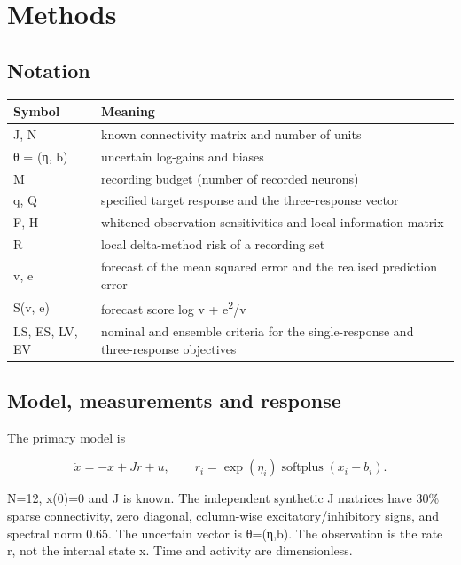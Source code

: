 \section{Methods}

\subsection{Notation}

\begin{table}[!t]
\centering\small
\begin{tabular*}{\textwidth}{@{\extracolsep{\fill}}ll}
\toprule
Symbol & Meaning \\
\midrule
J, N & known connectivity matrix and number of units \\
θ = (η, b) & uncertain log-gains and biases \\
M & recording budget (number of recorded neurons) \\
q, Q & specified target response and the three-response vector \\
F, H & whitened observation sensitivities and local information matrix \\
R & local delta-method risk of a recording set \\
v, e & forecast of the mean squared error and the realised prediction error \\
S(v, e) & forecast score log v + e\textsuperscript{2}/v \\
LS, ES, LV, EV & nominal and ensemble criteria for the single-response and three-response objectives \\
\bottomrule
\end{tabular*}
\end{table}

\subsection{Model, measurements and response}

The primary model is

\begin{equation}
\dot x=-x+Jr+u,\qquad
r_i=\exp(\eta_i)\operatorname{softplus}(x_i+b_i).
\end{equation}

N=12, x(0)=0 and J is known. The independent synthetic J matrices have 30\% sparse connectivity, zero diagonal, column-wise excitatory/inhibitory signs, and spectral norm 0.65. The uncertain vector is θ=(η,b). The observation is the rate r, not the internal state x. Time and activity are dimensionless.

